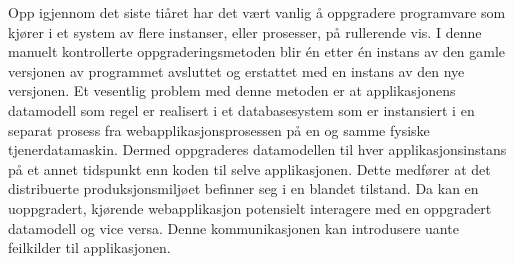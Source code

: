 Opp igjennom det siste tiåret har det vært vanlig å oppgradere programvare som kjører i et system av flere instanser, eller prosesser, på rullerende vis. I denne manuelt kontrollerte oppgraderingsmetoden blir én etter én instans av den gamle versjonen av programmet avsluttet og erstattet med en instans av den nye versjonen. Et vesentlig problem med denne metoden er at applikasjonens datamodell som regel er realisert i et databasesystem som er instansiert i en separat prosess fra webapplikasjonsprosessen på en og samme fysiske tjenerdatamaskin. Dermed oppgraderes datamodellen til hver applikasjonsinstans på et annet tidspunkt enn koden til selve applikasjonen. Dette medfører at det distribuerte produksjonsmiljøet befinner seg i en blandet tilstand. Da kan en uoppgradert, kjørende webapplikasjon potensielt interagere med en oppgradert datamodell og vice versa. Denne kommunikasjonen kan introdusere uante feilkilder til applikasjonen. %
